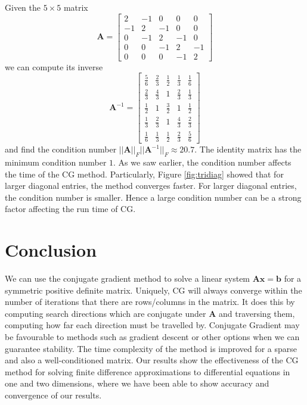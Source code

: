 \documentclass{article}
\begin{document}
Given the $5\times 5$ matrix
\begin{equation*}
	\mathbf{A} = \begin{bmatrix}
		2 & -1 & 0 & 0 & 0 \\
		-1 & 2 & -1 & 0 & 0 \\
		0 & -1 & 2 & -1 & 0 \\
		0 & 0 & -1 & 2 & -1 \\
		0 & 0 & 0 & -1 & 2
	\end{bmatrix}
\end{equation*}
we can compute its inverse
\begin{equation*}
	\mathbf{A}^{-1} = \begin{bmatrix}
		\frac{5}{6} & \frac{2}{3} & \frac{1}{2} & \frac{1}{3} & \frac{1}{6} \\
		\frac{2}{3} & \frac{4}{3} & 1 & \frac{2}{3} & \frac{1}{3} \\
		\frac{1}{2} & 1 & \frac{3}{2} & 1 & \frac{1}{2} \\
		\frac{1}{3} & \frac{2}{3} & 1 & \frac{4}{3} & \frac{2}{3} \\
		\frac{1}{6} & \frac{1}{3} & \frac{1}{2} & \frac{2}{3} & \frac{5}{6}
	\end{bmatrix}
\end{equation*}
and find the condition number $||\mathbf{A}||_F ||\mathbf{A}^{-1}||_F \approx 20.7$.
The identity matrix has the minimum condition number $1$.
As we saw earlier, the condition number affects the time of the CG method.
Particularly, Figure \ref{fig:tridiag} showed that for larger diagonal entries,
the method converges faster. For larger diagonal entries,
the condition number is smaller. Hence a large condition number can be a strong factor affecting the run time of CG.








\section{Conclusion}

We can use the conjugate gradient method to solve a linear system $\mathbf{Ax}=\mathbf{b}$ for a symmetric positive definite matrix.
Uniquely, CG will always converge within the number of iterations that there are rows/columns in the matrix.
It does this by computing search directions which are conjugate under $\mathbf{A}$ and traversing them,
computing how far each direction must be travelled by.
Conjugate Gradient may be favourable to methods such as gradient descent or other options when we can guarantee stability.
The time complexity of the method is improved for a sparse and also a well-conditioned matrix.
Our results show the effectiveness of the CG method for solving finite difference approximations to differential equations in one and two dimensions,
where we have been able to show accuracy and convergence of our results.
\end{document}
